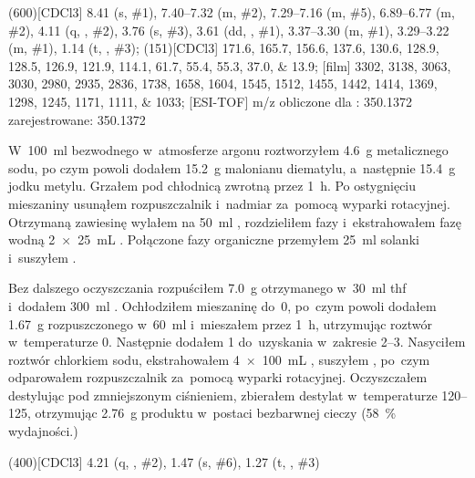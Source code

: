 \begin{fullexp}
  \NMR(600)[CDCl3] \num{8.41} (s, \#{1}), \numrange{7.40}{7.32} (m, \#{2}), \numrange{7.29}{7.16} (m, \#{5}), \numrange{6.89}{6.77} (m, \#{2}), \num{4.11} (q, , \#{2}), \num{3.76} (s, \#{3}), \num{3.61} (dd, , \#{1}), \numrange{3.37}{3.30} (m, \#{1}), \numrange{3.29}{3.22} (m, \#{1}), \num{1.14} (t, , \#{3});
  (151)[CDCl3] \numlist{171.6; 165.7; 156.6; 137.6; 130.6; 128.9; 128.5; 126.9; 121.9; 114.1; 61.7; 55.4; 55.3; 37.0; 13.9};
  [film] \numlist{3302; 3138; 3063; 3030; 2980; 2935; 2836; 1738; 1658; 1604; 1545; 1512; 1455; 1442; 1414; 1369; 1298; 1245; 1171; 1111; 1033};
  [ESI-TOF] m/z obliczone dla : \num{350.1372} zarejestrowane: \num{350.1372}
\end{fullexp}

W~\SI{100}{\ml} bezwodnego  w~atmosferze argonu roztworzyłem \SI{4.6}{\gram} metalicznego sodu,
  po czym powoli dodałem \SI{15.2}{\gram} malonianu diematylu, a~następnie \SI{15.4}{\gram} jodku metylu.
Grzałem pod chłodnicą zwrotną przez \SI{1}{\hour}.
Po ostygnięciu mieszaniny usunąłem rozpuszczalnik i~nadmiar  za~pomocą wyparki rotacyjnej.
Otrzymaną zawiesinę wylałem na \SI{50}{\ml} , rozdzieliłem fazy i~ekstrahowałem fazę wodną
  \SI[product-units = single]{2 x 25}{\mL} .
Połączone fazy organiczne przemyłem \SI{25}{\ml} solanki i~suszyłem .

Bez dalszego oczyszczania rozpuściłem \SI{7.0}{\gram} otrzymanego 
  w~\SI{30}{\ml} \gls{thf} i~dodałem \SI{300}{\ml} .
Ochłodziłem mieszaninę do~\SI{0}{\degC}, po~czym powoli dodałem \SI{1.67}{\gram} 
  rozpuszczonego w~\SI{60}{\ml}  i~mieszałem przez \SI{1}{\hour},
  utrzymując roztwór w~temperaturze \SI{0}{\degC}.
Następnie dodałem \SI{1}{\Molar}  do~uzyskania \pH w~zakresie \numrange{2}{3}.
Nasyciłem roztwór chlorkiem sodu, ekstrahowałem \SI[product-units = single]{4 x 100}{\mL} ,
  suszyłem , po~czym odparowałem rozpuszczalnik za~pomocą wyparki rotacyjnej.
Oczyszczałem destylując pod zmniejszonym ciśnieniem, zbierałem destylat w~temperaturze
  \SIrange{120}{125}{\degC}, otrzymując \SI{2.76}{\gram} produktu w~postaci bezbarwnej cieczy
  (\SI{58}{\percent} wydajności.)

\begin{fullexp}
  \NMR(400)[CDCl3] \num{4.21} (q, , \#{2}), \num{1.47} (s, \#{6}), \num{1.27} (t, , \#{3})
\end{fullexp}
  
